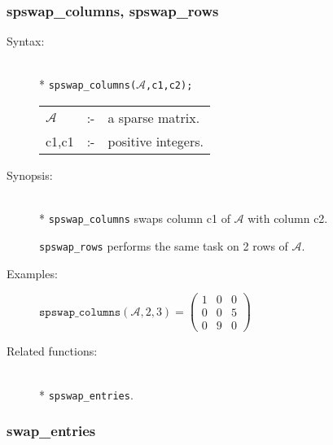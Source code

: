 \subsubsection{spswap\_columns, spswap\_rows}
\label{sparse:spswap_columns}

\begin{description}
\item[Syntax:]\mbox{}\\*
\texttt{spswap\_columns($\mathcal{A}$,c1,c2);}\\[2mm]
\begin{tabular}{l l l}
$\mathcal{A}$ &:-& a sparse matrix. \\
c1,c1      &:-& positive integers. 
\end{tabular}

\item[Synopsis:]\mbox{}\\*
\texttt{spswap\_columns} swaps column c1 of $\mathcal{A}$ with column c2. 

\texttt{spswap\_rows} performs the same task on 2 rows of 
                $\mathcal{A}$.

\item[Examples:]
\begin{flushleft}  
\begin{math}  
\texttt{spswap\_columns}(\mathcal{A},2,3) =
        \begin{pmatrix} 1 & 0 & 0 \\ 0 & 0 & 5 \\ 0 & 9 & 0 \end{pmatrix}
\end{math}  
\end{flushleft}

\item[Related functions:]\mbox{}\\*
\texttt{spswap\_entries}.
\end{description}

\subsubsection{swap\_entries}
\label{sparse:spadd_entries}

